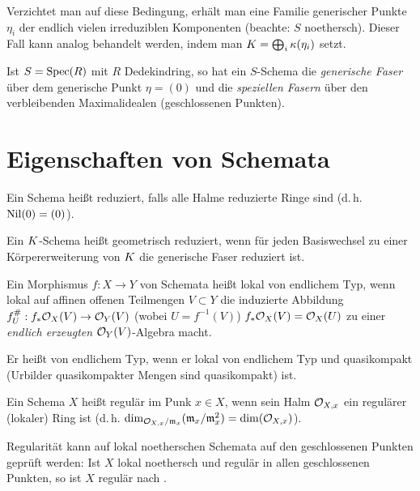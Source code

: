 \documentclass[german]{scrreprt}
\begin{document}
\begin{Definition}[Dedekindring]
\begin{Bemerkung}
    Verzichtet man auf diese Bedingung, erhält man eine Familie
    generischer Punkte $\eta_i$ der endlich vielen irreduziblen
    Komponenten (beachte: $S$ noethersch). Dieser Fall kann analog
    behandelt werden, indem man $K=\bigoplus_i \kappa(\eta_i)$ setzt.
  \end{Bemerkung}

  \begin{Bemerkung}
    Ist $S=\operatorname{Spec}(R)$ mit $R$ Dedekindring, so hat ein $S$-Schema die
    \emph{generische Faser} über dem generische Punkt $\eta=(0)$ und die
    \emph{speziellen Fasern} über den verbleibenden Maximalidealen
    (geschlossenen Punkten).
  \end{Bemerkung}
\end{Definition}

\section{Eigenschaften von Schemata}
\begin{Definition}
  Ein Schema heißt reduziert, falls alle Halme reduzierte Ringe sind
  (d.\,h. $\operatorname{Nil}(0)=(0)$).

  Ein $K$-Schema heißt geometrisch reduziert, wenn für jeden
  Basiswechsel zu einer Körpererweiterung von $K$ die generische
  Faser reduziert ist. 
\end{Definition}

\begin{Definition}
  Ein Morphismus $f\colon X\to Y$ von Schemata heißt lokal von endlichem
  Typ, wenn lokal auf affinen offenen Teilmengen $V\subset Y$ die
  induzierte Abbildung $f_U^\#: f_\ast\mathcal{O}_X(V)\to \mathcal{O}_Y(V)$
  (wobei $U=f^{-1}(V)$) $f_\ast\mathcal{O}_X(V)=\mathcal{O}_X(U)$ zu einer \emph{endlich erzeugten}
  $\mathcal{O}_Y(V)$-Algebra macht.

  Er heißt von endlichem Typ, wenn er lokal von endlichem Typ und
  quasikompakt (Urbilder quasikompakter Mengen sind quasikompakt) ist.
\end{Definition}

\begin{Definition}[Regulär]
  Ein Schema $X$ heißt regulär im Punk $x\in X$, wenn sein Halm
  $\mathcal{O}_{X,x}$ ein regulärer (lokaler) Ring ist
  (d.\,h. $\dim_{\mathcal{O}_{X,x}/\mathfrak{m}_x}(\mathfrak{m}_x/\mathfrak{m}_x^2)=\dim(\mathcal{O}_{X,x})$).

  Regularität kann auf lokal noetherschen Schemata auf den geschlossenen
  Punkten geprüft werden:
  Ist $X$ lokal noethersch und regulär in allen geschlossenen Punkten,
  so ist $X$ regulär nach \cite[Remark 6.25 (3)]{wedhorn}.
\end{Definition}
\end{document}
